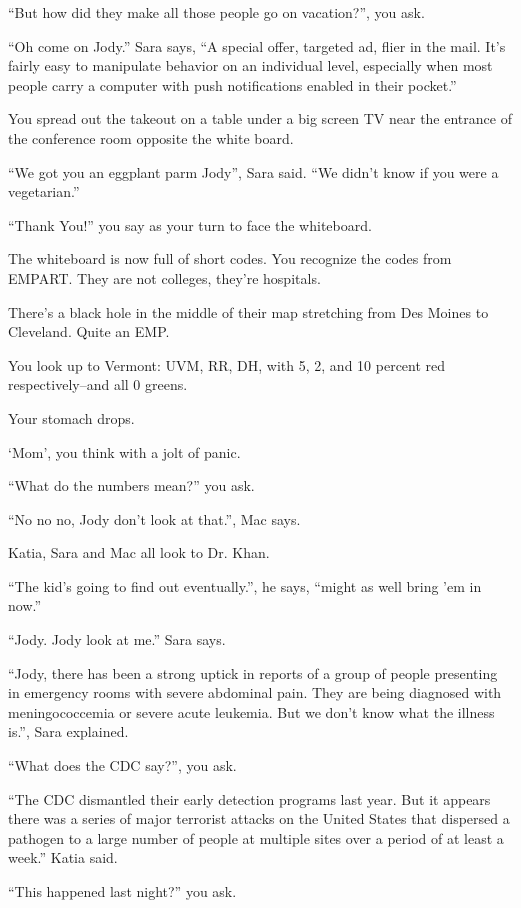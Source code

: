 \documentclass[17pt, twoside, a5paper, openright, extrafontsizes]{memoir}
\begin{document}
``But how did they make all those people go on vacation?'', you ask.

``Oh come on Jody.'' Sara says, ``A special offer, targeted ad, flier in
the mail. It's fairly easy to manipulate behavior on an individual
level, especially when most people carry a computer with push
notifications enabled in their pocket.''

You spread out the takeout on a table under a big screen TV near the
entrance of the conference room opposite the white board.

``We got you an eggplant parm Jody'', Sara said. ``We didn't know if you
were a vegetarian.''

``Thank You!'' you say as your turn to face the whiteboard.

The whiteboard is now full of short codes. You recognize the codes from
EMPART. They are not colleges, they're hospitals.

There's a black hole in the middle of their map stretching from Des
Moines to Cleveland. Quite an EMP.

You look up to Vermont: UVM, RR, DH, with 5, 2, and 10 percent red
respectively--and all 0 greens.

Your stomach drops.

`Mom', you think with a jolt of panic.

``What do the numbers mean?'' you ask.

``No no no, Jody don't look at that.'', Mac says.

Katia, Sara and Mac all look to Dr. Khan.

``The kid's going to find out eventually.'', he says, ``might as well
bring 'em in now.''

``Jody. Jody look at me.'' Sara says.

``Jody, there has been a strong uptick in reports of a group of people
presenting in emergency rooms with severe abdominal pain. They are being
diagnosed with meningococcemia or severe acute leukemia. But we don't
know what the illness is.'', Sara explained.

``What does the CDC say?'', you ask.

``The CDC dismantled their early detection programs last year. But it
appears there was a series of major terrorist attacks on the United
States that dispersed a pathogen to a large number of people at multiple
sites over a period of at least a week.'' Katia said.

``This happened last night?'' you ask.
\end{document}
